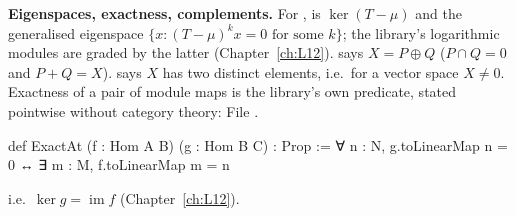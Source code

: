 \textbf{Eigenspaces, exactness, complements.} For ,
 is $\ker(T-\mu)$ and  the generalised
eigenspace $\{x : (T-\mu)^kx = 0\text{ for some }k\}$; the library's logarithmic modules are graded by
the latter (Chapter~\ref{ch:L12}).  says $X = P\oplus Q$ ($P\cap Q = 0$ and
$P+Q = X$).  says $X$ has two distinct elements, i.e.\ for a vector space $X\ne0$.
Exactness of a pair of module maps is the library's own predicate, stated pointwise without category
theory:
\noindent File .
\begin{leancode}
def ExactAt (f : Hom A B) (g : Hom B C) : Prop :=
  ∀ n : N, g.toLinearMap n = 0 ↔ ∃ m : M, f.toLinearMap m = n
\end{leancode}
i.e.\ $\ker g = \operatorname{im}f$ (Chapter~\ref{ch:L12}).


